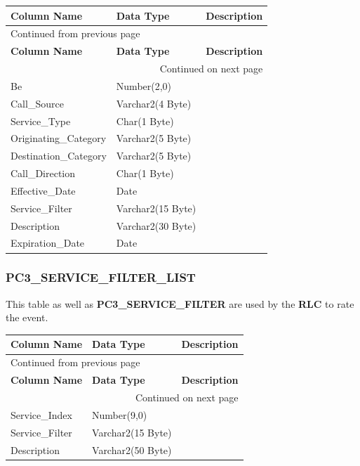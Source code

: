 \documentclass[12pt,twoside]{article}
\begin{document}
\begin{longtable}{l|l|l}
\hline
\textbf{Column Name} & \textbf{Data Type} & \textbf{Description}\\
\hline
\endfirsthead
\multicolumn{3}{l}{Continued from previous page} \\
\hline

\textbf{Column Name} & \textbf{Data Type} & \textbf{Description} \\

\hline
\endhead
\hline\multicolumn{3}{r}{Continued on next page} \\
\endfoot
\endlastfoot
\hline
Be & Number(2,0) & \\
Call\_Source & Varchar2(4 Byte) & \\
Service\_Type & Char(1 Byte) & \\
Originating\_Category & Varchar2(5 Byte) & \\
Destination\_Category & Varchar2(5 Byte) & \\
Call\_Direction & Char(1 Byte) & \\
Effective\_Date & Date & \\
Service\_Filter & Varchar2(15 Byte) & \\
Description & Varchar2(30 Byte) & \\
Expiration\_Date & Date & \\
\hline
\end{longtable}

\normalsize

\subsubsection{PC3\_SERVICE\_FILTER\_LIST}
\label{sec:orgheadline60}
This table as well as \textbf{PC3\_SERVICE\_FILTER} are used by
the \textbf{RLC} to rate the event.
\footnotesize
\begin{longtable}{l|l|l}
\hline
\textbf{Column Name} & \textbf{Data Type} & \textbf{Description}\\
\hline
\endfirsthead
\multicolumn{3}{l}{Continued from previous page} \\
\hline

\textbf{Column Name} & \textbf{Data Type} & \textbf{Description} \\

\hline
\endhead
\hline\multicolumn{3}{r}{Continued on next page} \\
\endfoot
\endlastfoot
\hline
Service\_Index & Number(9,0) & \\
Service\_Filter & Varchar2(15 Byte) & \\
Description & Varchar2(50 Byte) & \\
\hline
\end{longtable}
\end{document}
